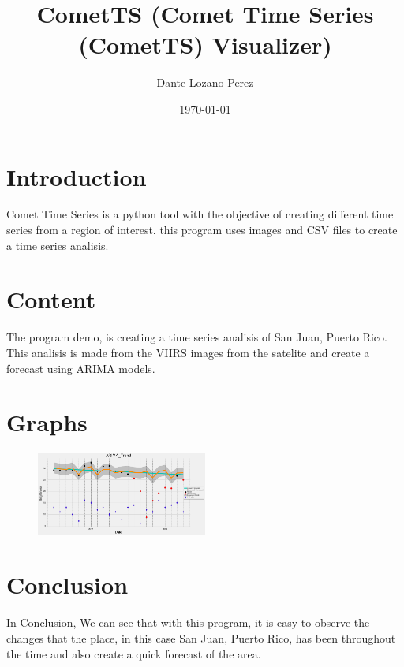 \documentclass[12pt, letterpaper]{article}
\title{CometTS (Comet Time Series (CometTS) Visualizer)}
\author{Dante Lozano-Perez}\thanks{Mun Summer2020 CMSC6950}
\date{\today}
\begin{document}
\maketitle
\section{Introduction}
Comet Time Series is a python tool with the objective of creating different time series from a region of interest. this program uses images and CSV files to create a time series analisis.

\section{Content}

The program demo, is creating a time series analisis of San Juan, Puerto Rico. This analisis is made from the VIIRS images from the satelite and create a forecast using ARIMA models.


\section{Graphs}
\begin{figure}
    \centering
    \includegraphics[width=0.5\textwidth]{ARIMA.png}
\end{figure}

\section{Conclusion}
In Conclusion, We can see that with this program, it is easy to observe the changes that the place, in this case San Juan, Puerto Rico, has been throughout the time and also create a quick forecast of the area.
\end{document}
